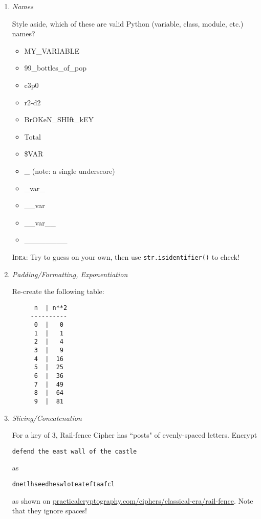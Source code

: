 \documentclass{article}
\begin{document}
  \begin{enumerate}
    \item \textit{Names}

    Style aside, which of these are valid Python (variable, class, module, etc.) names?
    \begin{itemize}
      \item MY\_VARIABLE
      \item 99\_bottles\_of\_pop
      \item c3p0
      \item r2-d2
      \item BrOKeN\_SHIft\_kEY
      \item Total
      \item \$VAR
      \item \_ (note: a single underscore)
      \item \_var\_
      \item \_\_var
      \item \_\_var\_\_
      \item \_\_\_\_\_\_\_\_
    \end{itemize}

    \textsc{Idea}: Try to guess on your own, then use \texttt{str.isidentifier()}
    to check!

    \item \textit{Padding/Formatting, Exponentiation}

    Re-create the following table:
    \begin{verbatim}
      n  | n**2
     ----------
      0  |   0
      1  |   1
      2  |   4
      3  |   9
      4  |  16
      5  |  25
      6  |  36
      7  |  49
      8  |  64
      9  |  81
    \end{verbatim}

    \item \textit{Slicing/Concatenation}

    For a key of 3, Rail-fence Cipher has ``posts" of 
    evenly-spaced letters. Encrypt

    \begin{center}
      \texttt{defend the east wall of the castle}
    \end{center}

    as 

    \begin{center}
      \texttt{dnetlhseedheswloteateftaafcl}
    \end{center}


    as shown on \url{practicalcryptography.com/ciphers/classical-era/rail-fence}.
    Note that they ignore spaces! 
    

\end{enumerate}
\end{document}

